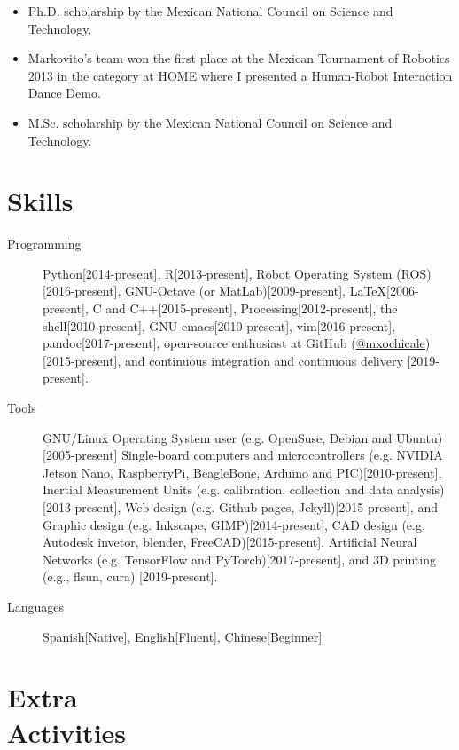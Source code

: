 \documentclass{mycv}
\begin{document}
\begin{itemize}
\item Ph.D. scholarship by the Mexican National Council on Science and Technology. 

\item Markovito's team  won the first place at the Mexican Tournament of Robotics 2013 in the category at HOME where I presented a Human-Robot Interaction Dance Demo. \href{https://www.youtube.com/watch?v=Kw-lZam_qZI}{\faYoutube} 

\item M.Sc. scholarship by the Mexican National Council on Science and Technology. 
\end{itemize}


\section{Skills}
\begin{description}
  \item[Programming] Python[2014-present],
R[2013-present], 
Robot Operating System (ROS)[2016-present],
GNU-Octave (or MatLab)[2009-present],
\LaTeX [2006-present], 
C and C++[2015-present],
Processing[2012-present], 
the shell[2010-present], 
GNU-emacs[2010-present],
vim[2016-present], 
pandoc[2017-present],
open-source enthusiast at GitHub (\href{https://github.com/mxochicale}{@mxochicale})[2015-present], 
and continuous integration and continuous delivery [2019-present]. 
  \item[Tools] 
GNU/Linux Operating System user (e.g. OpenSuse, Debian and Ubuntu)[2005-present]
Single-board computers and microcontrollers (e.g. 
NVIDIA Jetson Nano, RaspberryPi, BeagleBone, Arduino and PIC)[2010-present],
Inertial Measurement Units (e.g. calibration, collection and data analysis)[2013-present], 
Web design (e.g. Github pages, Jekyll)[2015-present], and
Graphic design (e.g. Inkscape, GIMP)[2014-present],
CAD design (e.g. Autodesk invetor, blender, FreeCAD)[2015-present], 
Artificial Neural Networks (e.g. TensorFlow and PyTorch)[2017-present], and
3D printing (e.g., flsun, cura) [2019-present].
  \item[Languages] Spanish[Native], English[Fluent], Chinese[Beginner]
\end{description}




\section{Extra \\ Activities}
\end{document}
